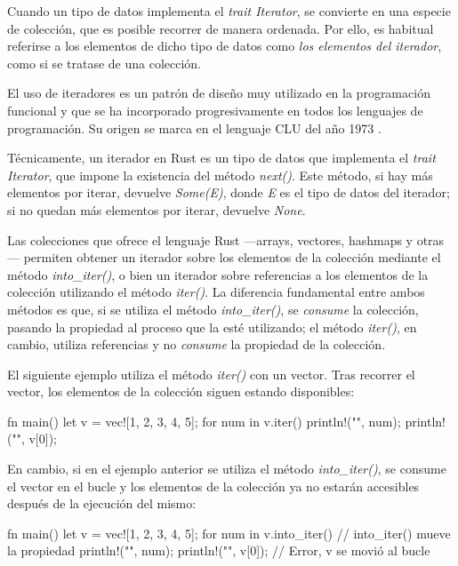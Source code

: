 Cuando un tipo de datos implementa el \textit{trait Iterator}, se convierte en una especie de colección, que es posible recorrer de manera ordenada. Por ello, es habitual referirse a los elementos de dicho tipo de datos como \textit{los elementos del iterador}, como si se tratase de una colección.

El uso de iteradores es un patrón de diseño muy utilizado en la programación funcional y que se ha incorporado progresivamente en todos los lenguajes de programación. Su origen se marca en el lenguaje CLU del año 1973 \citep{wikipediaCLUProgrammingLanguage2024}.

Técnicamente, un iterador en Rust es un tipo de datos que implementa el \textit{trait Iterator}, que impone la existencia del método \textit{next()}. Este método, si hay más elementos por iterar, devuelve \textit{Some(E)}, donde \textit{E} es el tipo de datos del iterador; si no quedan más elementos por iterar, devuelve \textit{None}.

Las colecciones que ofrece el lenguaje Rust ---arrays, vectores, hashmaps y otras--- permiten obtener un iterador sobre los elementos de la colección mediante el método \textit{into\_iter()}, o bien un iterador sobre referencias a los elementos de la colección utilizando el método \textit{iter()}. La diferencia fundamental entre ambos métodos es que, si se utiliza el método \textit{into\_iter()}, se \textit{consume} la colección, pasando la propiedad al proceso que la esté utilizando; el método \textit{iter()}, en cambio, utiliza referencias y no \textit{consume} la propiedad de la colección.

El siguiente ejemplo utiliza el método \textit{iter()} con un vector. Tras recorrer el vector, los elementos de la colección siguen estando disponibles:

\vspace{0.7em}
\begin{Codigo}
   fn main() {
      let v = vec![1, 2, 3, 4, 5];
      for num in v.iter() {
         println!("{}", num);
      }
      println!("{}", v[0]);
   }
\end{Codigo}

En cambio, si en el ejemplo anterior se utiliza el método \textit{into\_iter()}, se consume el vector en el bucle y los elementos de la colección ya no estarán accesibles después de la ejecución del mismo:

\vspace{0.7em}
\begin{Codigo}
   fn main() {
      let v = vec![1, 2, 3, 4, 5];
      for num in v.into_iter() { // into_iter() mueve la propiedad
         println!("{}", num);
      }
      println!("{}", v[0]); // Error, v se movió al bucle
   }
\end{Codigo}

